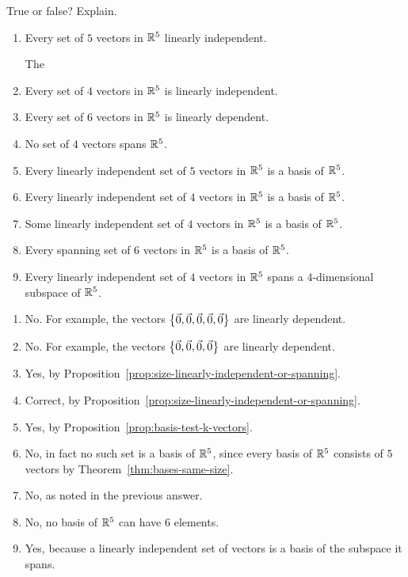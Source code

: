 \documentclass{ximera}
\author{Zack Reed}
\begin{document}
\begin{exercise}

    True or false? Explain.
    \begin{enumerate}
    \item Every set of $5$ vectors in $\mathbb{R}^5$  linearly independent.
        \begin{problem}
            The 
        \end{problem}
    \item Every set of $4$ vectors in $\mathbb{R}^5$ is linearly independent.
    \item Every set of $6$ vectors in $\mathbb{R}^5$ is linearly dependent.
    \item No set of $4$ vectors spans $\mathbb{R}^5$.
    \item Every linearly independent set of $5$ vectors in $\mathbb{R}^5$ is a
      basis of $\mathbb{R}^5$.
    \item Every linearly independent set of $4$ vectors in $\mathbb{R}^5$ is a
      basis of $\mathbb{R}^5$.
    \item Some linearly independent set of $4$ vectors in $\mathbb{R}^5$ is a
      basis of $\mathbb{R}^5$.
    \item Every spanning set of $6$ vectors in $\mathbb{R}^5$ is a basis of
      $\mathbb{R}^5$.
    \item Every linearly independent set of $4$ vectors in $\mathbb{R}^5$ spans
      a $4$-dimensional subspace of $\mathbb{R}^5$.
    \end{enumerate}

      \begin{enumerate}
      \item No. For example, the vectors
        $\left\{\vec{0},\vec{0},\vec{0},\vec{0},\vec{0}\right\}$ are
        linearly dependent.
      \item No. For example, the vectors
        $\left\{\vec{0},\vec{0},\vec{0},\vec{0}\right\}$ are linearly
        dependent.
      \item Yes, by Proposition~\ref{prop:size-linearly-independent-or-spanning}.
      \item Correct, by Proposition~\ref{prop:size-linearly-independent-or-spanning}.
      \item Yes, by Proposition~\ref{prop:basis-test-k-vectors}.
      \item No, in fact no such set is a basis of $\mathbb{R}^5$, since every
        basis of $\mathbb{R}^5$ consists of $5$ vectors by
        Theorem~\ref{thm:bases-same-size}.
      \item No, as noted in the previous answer.
      \item No, no basis of $\mathbb{R}^5$ can have $6$ elements.
      \item Yes, because a linearly independent set of vectors is a
        basis of the subspace it spans.
      \end{enumerate}

\end{exercise}
\end{document}
